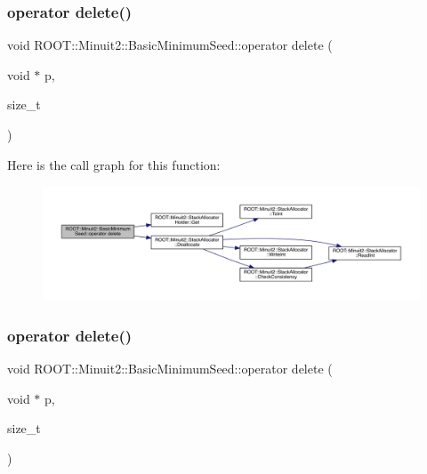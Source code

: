 \subsubsection{\texorpdfstring{operator delete()}{operator delete()}\hspace{0.1cm}{\footnotesize\ttfamily [2/3]}}
{\footnotesize\ttfamily void R\+O\+O\+T\+::\+Minuit2\+::\+Basic\+Minimum\+Seed\+::operator delete (\begin{DoxyParamCaption}\item[{void $\ast$}]{p,  }\item[{size\+\_\+t}]{ }\end{DoxyParamCaption})\hspace{0.3cm}{\ttfamily [inline]}}

Here is the call graph for this function\+:
\nopagebreak
\begin{figure}[H]
\begin{center}
\leavevmode
\includegraphics[width=350pt]{de/d50/classROOT_1_1Minuit2_1_1BasicMinimumSeed_ae2af98f9f03cfe5e5202153b914ff120_cgraph}
\end{center}
\end{figure}
\mbox{\label{classROOT_1_1Minuit2_1_1BasicMinimumSeed_ae2af98f9f03cfe5e5202153b914ff120}} 
\subsubsection{\texorpdfstring{operator delete()}{operator delete()}\hspace{0.1cm}{\footnotesize\ttfamily [3/3]}}
{\footnotesize\ttfamily void R\+O\+O\+T\+::\+Minuit2\+::\+Basic\+Minimum\+Seed\+::operator delete (\begin{DoxyParamCaption}\item[{void $\ast$}]{p,  }\item[{size\+\_\+t}]{ }\end{DoxyParamCaption})\hspace{0.3cm}{\ttfamily [inline]}}

